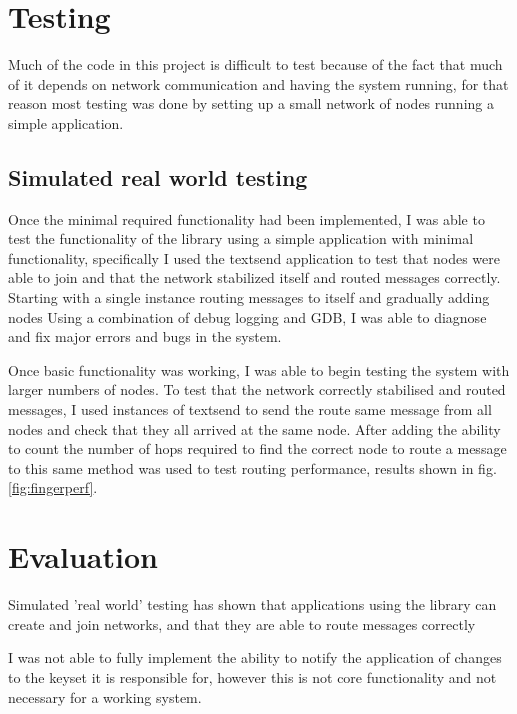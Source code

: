\documentclass{article}
\begin{document}
\section{Testing}

Much of the code in this project is difficult to test because of the fact that much of it depends on network communication and having the system running, for that reason most testing was done by setting up a small network of nodes running a simple application.

\subsection{Simulated real world testing}

Once the minimal required functionality had been implemented, I was able to test the functionality of the library using a simple application with minimal functionality, specifically I used the textsend application to test that nodes were able to join and that the network stabilized itself and routed messages correctly. Starting with a single instance routing messages to itself and gradually adding nodes Using a combination of debug logging and GDB, I was able to diagnose and fix major errors and bugs in the system.

Once basic functionality was working, I was able to begin testing the system with larger numbers of nodes. To test that the network correctly stabilised and routed messages, I used instances of textsend to send the route same message from all nodes and check that they all arrived at the same node. After adding the ability to count the number of hops required to find the correct node to route a message to this same method was used to test routing performance, results shown in fig. \ref{fig:fingerperf}.

\section{Evaluation}


Simulated 'real world' testing has shown that applications using the library can create and join networks, and that they are able to route messages correctly

I was not able to fully implement the ability to notify the application of changes to the keyset it is responsible for, however this is not core functionality and not necessary for a working system.
\end{document}

